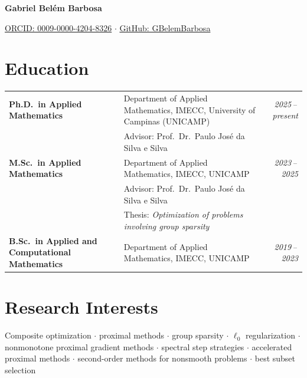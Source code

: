 \documentclass[11pt,a4paper]{article}
\begin{document}
\begin{center}
    {\LARGE\bfseries Gabriel Belém Barbosa}

    \vspace{0.4em}
    \href{https://orcid.org/0009-0000-4204-8326}{ORCID: 0009-0000-4204-8326} \quad$\cdot$\quad
    \href{https://github.com/GBelemBarbosa}{GitHub: GBelemBarbosa}
\end{center}

\vspace{0.3em}

\section{Education}

\begin{tabularx}{\textwidth}{@{}lXr@{}}
    \textbf{Ph.D.\ in Applied Mathematics} & \small Department of Applied Mathematics, IMECC, University of Campinas (UNICAMP) & \textit{2025\,--\,present} \\
    & \small Advisor: Prof.\ Dr.\ Paulo José da Silva e Silva &  \\[0.6em]

    \textbf{M.Sc.\ in Applied Mathematics} & \small Department of Applied Mathematics, IMECC, UNICAMP & \textit{2023\,--\,2025} \\
    & \small Advisor: Prof.\ Dr.\ Paulo José da Silva e Silva & \\
    & \small Thesis: \textit{Optimization of problems involving group sparsity} & \\[0.6em]

    \textbf{B.Sc.\ in Applied and Computational Mathematics} & \small Department of Applied Mathematics, IMECC, UNICAMP & \textit{2019\,--\,2023} \\
\end{tabularx}

\section{Research Interests}

Composite optimization $\cdot$
proximal methods $\cdot$
group sparsity $\cdot$
$\ell_0$ regularization $\cdot$
nonmonotone proximal gradient methods $\cdot$
spectral step strategies $\cdot$
accelerated proximal methods $\cdot$
second-order methods for nonsmooth problems $\cdot$
best subset selection

\end{document}
